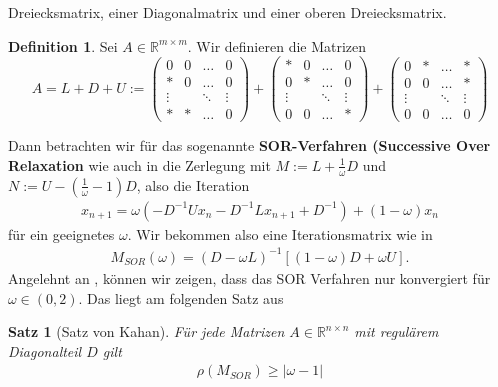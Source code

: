 \documentclass[smallheadings]{scrartcl}
\newtheorem{theorem}{Satz}
\theoremstyle{definition}
\newtheorem{definition}{Definition}[section]
\begin{document}
			Dreiecksmatrix, einer Diagonalmatrix und einer oberen Dreiecksmatrix.
			\begin{definition}
			Sei $A\in \mathbb{R}^{m\times m}$.  Wir definieren die Matrizen
			$$A=L+D+U:=\begin{pmatrix}
			0&0&\hdots &0\\
			*&0&\hdots &0\\
			\vdots &&\ddots &\vdots\\
			*&*&\hdots &0
			\end{pmatrix}+\begin{pmatrix}
			*&0&\hdots &0\\
			0&*&\hdots &0\\
			\vdots &&\ddots &\vdots\\
			0&0&\hdots &*
			\end{pmatrix}+\begin{pmatrix}
			0&*&\hdots &*\\
			0&0&\hdots &*\\
			\vdots &&\ddots &\vdots\\
			0&0&\hdots &0
			\end{pmatrix}$$
			
			\end{definition}
			
			Dann betrachten wir für das sogenannte \textbf{SOR-Verfahren (Successive 
			Over Relaxation} wie auch in \citep{skrpit} die Zerlegung  mit
			$M:=L+\frac{1}{\omega}D$ und $N:=U-(\frac{1}{\omega} -1)D$,  also die 
			Iteration 
			\begin{align}\label{sor_iteration}
			x_{n+1}=\omega (-D^{-1}Ux_n-D^{-1}Lx_{n+1}+D^{-1})+(1-\omega )x_n
			\end{align}
			für ein geeignetes $\omega$.
			Wir bekommen also eine Iterationsmatrix wie in \citep{konvergenz}
			\begin{align*}
			M_{SOR}(\omega )=(D-\omega L)^{-1}[(1-\omega)D+\omega U].
			\end{align*}
			Angelehnt an \citep{konvergenz}, können wir zeigen,  dass das SOR Verfahren nur konvergiert für $\omega \in (0,2)$. Das liegt am folgenden Satz aus \citep{kovergenz}
			
			\begin{theorem}[Satz von Kahan]
			Für jede Matrizen $A\in \mathbb{R}^{n\times n }$ mit regulärem Diagonalteil $D$ gilt 
			\begin{align}\label{omegabetween02}
			\rho (M_{SOR} )\geq |\omega -1|
			\end{align}
			\end{theorem}
			
\end{document}
